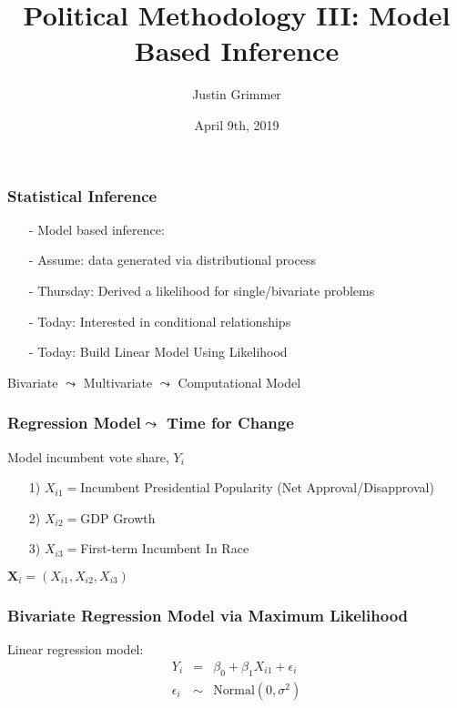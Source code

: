 \documentclass{beamer}
\title[Methodology III] %
{Political Methodology III: Model Based Inference}
\author{Justin Grimmer}
\institute[Stanford University]{Professor\\Department of Political Science \\  Stanford University}
\date{April 9th, 2019}
\begin{document}
\begin{frame}
\titlepage
\end{frame}




\begin{frame}
\frametitle{Statistical Inference}


\begin{itemize}
\item[-] Model based inference:
\item[-] \alert{Assume}: data generated via distributional process
\item[-] Thursday: Derived a likelihood for single/bivariate problems
\item[-] Today: Interested in conditional relationships
\item[-] Today: Build Linear Model Using Likelihood
\end{itemize}
Bivariate \alert{$\leadsto$} Multivariate $\leadsto$ Computational Model
\end{frame}


\begin{frame}
\frametitle{Regression Model$\leadsto$ Time for Change}

Model incumbent vote share, $Y_{i}$
\begin{itemize}
\item[1)] $X_{i1} = $Incumbent Presidential Popularity (Net Approval/Disapproval)
\item[2)] $X_{i2} = $GDP Growth
\item[3)] $X_{i3} = $First-term Incumbent In Race
\end{itemize}
$\boldsymbol{X}_{i} = (X_{i1}, X_{i2}, X_{i3})$





\end{frame}


\begin{frame}
\frametitle{Bivariate Regression Model via Maximum Likelihood}

Linear regression model:
\begin{eqnarray}
Y_{i} & = & \beta_{0} + \beta_{1}X_{i1} + \epsilon_{i} \nonumber \\
\epsilon_{i} & \sim & \text{Normal}(0, \sigma^{2}) \nonumber
\end{eqnarray}
\pause
{} \pause



\end{frame}
\end{document}
